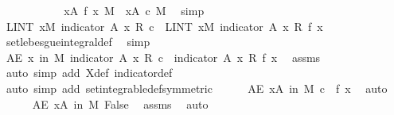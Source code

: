 \begin{isabellebody}
\ \ \ \ \ \ \ \ \isamarkupfalse%
\ \isamarkupfalse%
\ {\isachardoublequoteopen}{\isacharparenleft}{\kern0pt}{\isasymintegral}x{\isasymin}A{\isachardot}{\kern0pt}\ f\ x\ {\isasympartial}M{\isacharparenright}{\kern0pt}\ {\isasymle}\ {\isacharparenleft}{\kern0pt}{\isasymintegral}x{\isasymin}A{\isachardot}{\kern0pt}\ c\ {\isasympartial}M{\isacharparenright}{\kern0pt}{\isachardoublequoteclose}\ \isamarkupfalse%
\ simp\isanewline
\ \ \ \ \ \ \isacommand{{\isacharbraceright}{\kern0pt}}\isamarkupfalse%
\isanewline
\ \ \ \ \ \ \isamarkupfalse%
\ \isamarkupfalse%
\ {\isachardoublequoteopen}LINT\ x{\isacharbar}{\kern0pt}M{\isachardot}{\kern0pt}\ indicator\ A\ x\ {\isacharasterisk}{\kern0pt}\isactrlsub R\ c\ {\isacharequal}{\kern0pt}\ LINT\ x{\isacharbar}{\kern0pt}M{\isachardot}{\kern0pt}\ indicator\ A\ x\ {\isacharasterisk}{\kern0pt}\isactrlsub R\ f\ x{\isachardoublequoteclose}\ \isamarkupfalse%
\ set{\isacharunderscore}{\kern0pt}lebesgue{\isacharunderscore}{\kern0pt}integral{\isacharunderscore}{\kern0pt}def\ \isamarkupfalse%
\ simp\isanewline
\ \ \ \ \ \ \isamarkupfalse%
\ {\isachardoublequoteopen}AE\ x\ in\ M{\isachardot}{\kern0pt}\ indicator\ A\ x\ {\isacharasterisk}{\kern0pt}\isactrlsub R\ c\ {\isasymle}\ indicator\ A\ x\ {\isacharasterisk}{\kern0pt}\isactrlsub R\ f\ x{\isachardoublequoteclose}\ \isamarkupfalse%
\ assms\ \isamarkupfalse%
\ {\isacharparenleft}{\kern0pt}auto\ simp\ add{\isacharcolon}{\kern0pt}\ X{\isacharunderscore}{\kern0pt}def\ indicator{\isacharunderscore}{\kern0pt}def{\isacharparenright}{\kern0pt}\isanewline
\ \ \ \ \isamarkupfalse%
\ {\isacharparenleft}{\kern0pt}auto\ simp\ add{\isacharcolon}{\kern0pt}\ set{\isacharunderscore}{\kern0pt}integrable{\isacharunderscore}{\kern0pt}def{\isacharbrackleft}{\kern0pt}symmetric{\isacharbrackright}{\kern0pt}{\isacharparenright}{\kern0pt}\isanewline
\ \ \ \ \isamarkupfalse%
\ {\isachardoublequoteopen}AE\ x{\isasymin}A\ in\ M{\isachardot}{\kern0pt}\ c\ {\isacharequal}{\kern0pt}\ f\ x{\isachardoublequoteclose}\ \isamarkupfalse%
\ auto\isanewline
\ \ \ \ \isamarkupfalse%
\ {\isachardoublequoteopen}AE\ x{\isasymin}A\ in\ M{\isachardot}{\kern0pt}\ False{\isachardoublequoteclose}\ \isamarkupfalse%
\ assms{\isacharparenleft}{\kern0pt}{}{\isacharparenright}{\kern0pt}\ \isamarkupfalse%
\ auto\isanewline
\ \ \ \ \isamarkupfalse%

\end{isabellebody}
